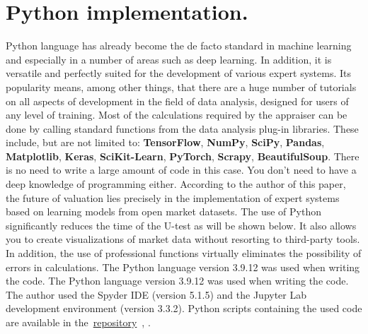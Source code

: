 \documentclass[]{scrreprt}
\begin{document}
\section{Python implementation.}\label{U-test-Python}
%
%
Python language has already become the de facto standard in machine learning and especially in a number of areas such as deep learning. In addition, it is versatile and perfectly suited for the development of various expert systems.  Its popularity means, among other things, that there are a huge number of tutorials on all aspects of development in the field of data analysis, designed for users of any level of training. Most of the calculations required by the appraiser can be done by calling standard functions from the data analysis plug-in libraries. These include, but are not limited to: \textbf{TensorFlow}, \textbf{NumPy}, \textbf{SciPy}, \textbf{Pandas}, \textbf{Matplotlib}, \textbf{Keras}, \textbf{SciKit-Learn}, \textbf{PyTorch}, \textbf{Scrapy}, \textbf{BeautifulSoup}. There is no need to write a large amount of code in this case. You don't need to have a deep knowledge of programming either. According to the author of this paper, the future of valuation lies precisely in the implementation of expert systems based on learning models from open market datasets. The use of Python significantly reduces the time of the U-test as will be shown below. It also allows you to create visualizations of market data without resorting to third-party tools. In addition, the use of professional functions virtually eliminates the possibility of errors in calculations. The Python language version 3.9.12 was used when writing the code. The Python language version 3.9.12 was used when writing the code. The author used the Spyder IDE (version 5.1.5) and the Jupyter Lab development environment (version 3.3.2). Python scripts containing the used code are available in the~\href{https://github.com/Kirill-Murashev/AI_for_valuers_Python_source/tree/main/Mann-Whitney-u-test}{repository}~\cite{Murashev:U-test.py}, \cite{Murashev:U-test.ipynb}.
\end{document}
